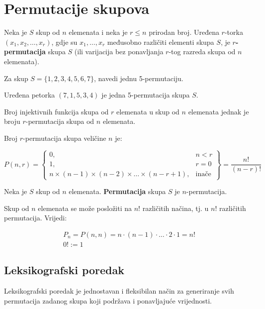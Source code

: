 \section{Permutacije skupova}

Neka je $S$ skup od $n$ elemenata i neka je $r\leq n$ prirodan broj. Uređena
$r$-torka $(x_1,x_2,\dots,x_r)$, gdje su $x_1,\dots,x_r$ međusobno različiti
elementi skupa $S$, je \textbf{$r$-permutacija} skupa $S$ (ili varijacija bez
ponavljanja $r$-tog razreda skupa od $n$ elemenata).

\begin{example}
    Za skup $S=\{1,2,3,4,5,6,7\}$, navedi jednu 5-permutaciju.
\end{example}

Uređena petorka $(7,1,5,3,4)$ je jedna 5-permutacija skupa $S$.

\begin{theorem}
    Broj injektivnih funkcija skupa od $r$ elemenata u skup od $n$ elemenata
    jednak je broju $r$-permutacija skupa od $n$ elemenata.
\end{theorem}

Broj $r$-permutacija skupa veličine $n$ je:

$$
    P(n, r) =
    \begin{Bmatrix}
        0, & n < r\\
        1, & r = 0\\
        n \times (n - 1) \times (n - 2) \times \dots \times (n - r + 1), & \text{inače}
    \end{Bmatrix}
    = \frac{n!}{(n-r)!}
$$

Neka je $S$ skup od $n$ elemenata. \textbf{Permutacija} skupa $S$ je
$n$-permutacija.

Skup od $n$ elemenata se može posložiti na $n!$ različitih načina, tj. u $n!$
različitih permutacija. Vrijedi:

\begin{gather*}
    P_n = P(n, n) = n \cdot (n-1) \cdot \dots \cdot 2 \cdot 1 = n!\\
    0! := 1
\end{gather*}

\subsection{Leksikografski poredak}

Leksikografski poredak je jednostavan i fleksibilan način za generiranje svih
permutacija zadanog skupa koji podržava i ponavljajuće vrijednosti.

